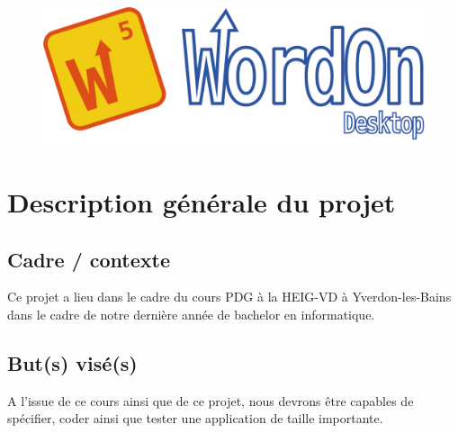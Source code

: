 \documentclass[a4paper,12pt]{article}
\author{\auteur}
\title{\titre}
\date{\today}
\begin{document}
	\clearpage\maketitle
	\thispagestyle{empty}
	
	\maketitle
	\begin{figure}[h!]
		\centering
		\includegraphics[scale=1]{logo/logo.png}
	\end{figure}
	\newpage
	
	
	\tableofcontents
	
	\listoffigures
	
	
	\newpage
	
	\section{Description générale du projet}
	\subsection{Cadre / contexte}
	Ce projet a lieu dans le cadre du cours PDG à la HEIG-VD à Yverdon-les-Bains dans le cadre de notre dernière année de bachelor en informatique.
	
	\subsection{But(s) visé(s)}
	A l'issue de ce cours ainsi que de ce projet, nous devrons être capables de spécifier, coder ainsi que tester une application de taille importante.
	
\end{document}
